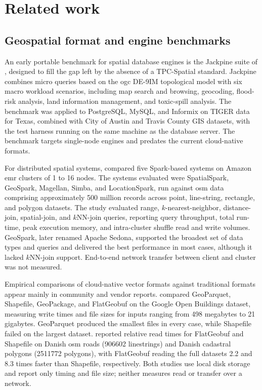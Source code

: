 \section{Related work}
\subsection{Geospatial format and engine benchmarks}

An early portable benchmark for spatial database engines is the Jackpine suite of \textcite{ray2011_jackpine_spatial_database_benchmark}, designed to fill the gap left by the absence of a TPC-Spatial standard. Jackpine combines micro queries based on the \acrshort{ogc} DE-9IM topological model with six macro workload scenarios, including map search and browsing, geocoding, flood-risk analysis, land information management, and toxic-spill analysis. The benchmark was applied to PostgreSQL, MySQL, and Informix on TIGER data for Texas, combined with City of Austin and Travis County GIS datasets, with the test harness running on the same machine as the database server. The benchmark targets single-node engines and predates the current cloud-native formats.

For distributed spatial systems, \textcite{pandey2018_how_good_modern_spatial_analytics} compared five Spark-based systems on Amazon \acrshort{emr} clusters of \num{1} to \num{16} nodes. The systems evaluated were SpatialSpark, GeoSpark, Magellan, Simba, and LocationSpark, run against \acrfull{osm} data comprising approximately \num{500} million records across point, line-string, rectangle, and polygon datasets. The study evaluated range, $k$-nearest-neighbor, distance-join, spatial-join, and $k$NN-join queries, reporting query throughput, total run-time, peak execution memory, and intra-cluster shuffle read and write volumes. GeoSpark, later renamed Apache Sedona, supported the broadest set of data types and queries and delivered the best performance in most cases, although it lacked $k$NN-join support. End-to-end network transfer between client and cluster was not measured.

Empirical comparisons of cloud-native vector formats against traditional formats appear mainly in community and vendor reports. \textcite{holmes2023_geoparquet_performance} compared GeoParquet, Shapefile, GeoPackage, and FlatGeobuf on the Google Open Buildings dataset, measuring write times and file sizes for inputs ranging from \num{498} megabytes to \num{21} gigabytes. GeoParquet produced the smallest files in every case, while Shapefile failed on the largest dataset. \textcite{flatgeobuf2024_flatgeobuf_benchmarks} reported relative read times for FlatGeobuf and Shapefile on Danish \acrshort{osm} roads (\num{906602} linestrings) and Danish cadastral polygons (\num{2511772} polygons), with FlatGeobuf reading the full datasets \num{2.2} and \num{8.3} times faster than Shapefile, respectively. Both studies use local disk storage and report only timing and file size; neither measures read or transfer over a network.

